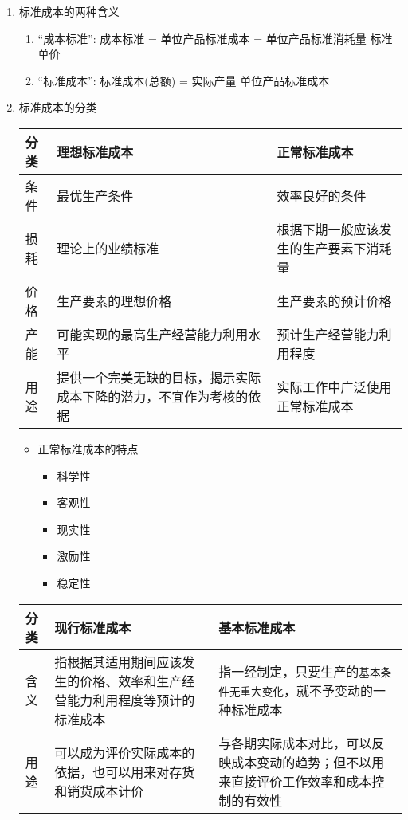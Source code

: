 \documentclass[11pt]{article}
\begin{document}
\begin{enumerate}
\item 标准成本的两种含义
\label{sec:org18a086a}
\begin{enumerate}
\item “成本标准”: 成本标准 = 单位产品标准成本 = 单位产品标准消耗量 \texttimes{} 标准单价
\item “标准成本”: 标准成本(总额) = 实际产量 \texttimes{} 单位产品标准成本
\end{enumerate}
\item 标准成本的分类
\label{sec:org0ad35fc}
\begin{center}
\begin{tabular}{lll}
分类 & 理想标准成本 & 正常标准成本\\
\hline
条件 & 最优生产条件 & 效率良好的条件\\
损耗 & 理论上的业绩标准 & 根据下期一般应该发生的生产要素下消耗量\\
价格 & 生产要素的理想价格 & 生产要素的预计价格\\
产能 & 可能实现的最高生产经营能力利用水平 & 预计生产经营能力利用程度\\
用途 & 提供一个完美无缺的目标，揭示实际成本下降的潜力，不宜作为考核的依据 & 实际工作中广泛使用正常标准成本\\
\end{tabular}
\end{center}
\begin{itemize}
\item 正常标准成本的特点
\begin{itemize}
\item 科学性
\item 客观性
\item 现实性
\item 激励性
\item 稳定性
\end{itemize}
\end{itemize}
\begin{center}
\begin{tabular}{lll}
分类 & 现行标准成本 & 基本标准成本\\
\hline
含义 & 指根据其适用期间应该发生的价格、效率和生产经营能力利用程度等预计的标准成本 & 指一经制定，只要生产的\texttt{基本条件无重大变化}，就不予变动的一种标准成本\\
用途 & 可以成为评价实际成本的依据，也可以用来对存货和销货成本计价 & 与各期实际成本对比，可以反映成本变动的趋势；但不以用来直接评价工作效率和成本控制的有效性\\
\end{tabular}
\end{center}


\end{enumerate}
\end{document}
